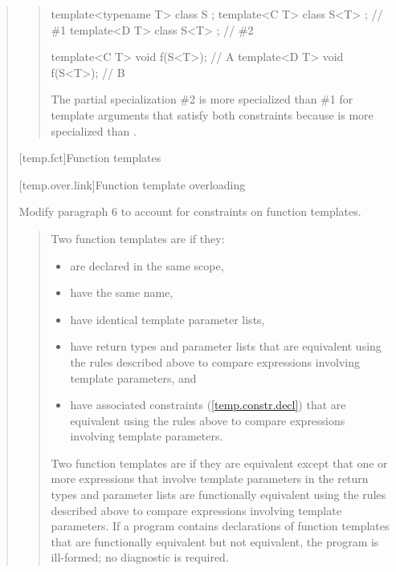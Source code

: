 \begin{quote}
\begin{quote}
\begin{addedblock}
\begin{codeblock}
template<typename T> class S { };
template<C T> class S<T> { }; // \#1
template<D T> class S<T> { }; // \#2

template<C T> void f(S<T>); // A
template<D T> void f(S<T>); // B
\end{codeblock}
The partial specialization \#2 is more specialized than 
\#1 for template arguments that satisfy both constraints because 
 is more specialized than .
\exitexample
\end{addedblock}
\end{quote}


[temp.fct]{Function templates}

[temp.over.link]{Function template overloading}

Modify paragraph 6 to account for constraints on function templates.

\begin{quote}
\setcounter{Paras}{5}
\pnum

% 
\begin{addedblock}
Two function templates are  if they:
\begin{itemize}
\item are declared in the same scope,

\item have the same name,

\item have identical template parameter lists,

\item have return types and parameter lists that are equivalent using the 
rules described above to compare expressions involving template parameters, and

\item have associated constraints (\ref{temp.constr.decl}) that are equivalent 
using the rules above to compare expressions involving template parameters.
\end{itemize}
\end{addedblock}
% 
Two function templates are  if they 
are equivalent except that one or more expressions that involve 
template parameters in the return types and parameter lists are functionally equivalent using 
the rules described above to compare expressions involving template parameters.
% 
If a program contains declarations of function templates that are 
functionally equivalent but not equivalent, the program is ill-formed; 
no diagnostic is required.
\end{quote}



\end{quote}
